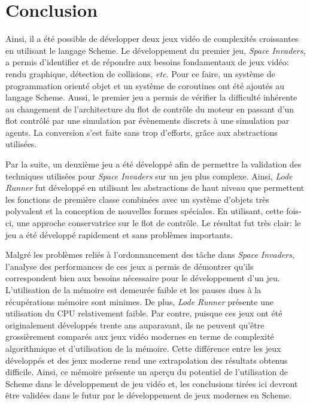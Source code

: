 \documentclass[12pt,twoside,letterpaper,francais]{book}
\begin{document}
\FloatBarrier
\section{Conclusion}
Ainsi, il a été possible de développer deux jeux vidéo de complexités
croissantes en utilisant le langage Scheme. Le dévelop\-pement du
premier jeu, \textit{Space Invaders}, a permis d'identifier et de
répondre aux besoins fondamentaux de jeux vidéo: rendu graphique,
détection de collisions, \textit{etc}. Pour ce faire, un système de
programmation orienté objet et un système de coroutines ont été
ajoutés au langage Scheme. Aussi, le premier jeu a permis de vérifier
la difficulté inhérente au changement de l'architecture du flot de
contrôle du moteur en passant d'un flot contrôlé par une simulation
par évènements discrets à une simulation par agents. La conversion
s'est faite sans trop d'efforts, grâce aux abstractions utilisées.

Par la suite, un deuxième jeu a été développé afin de permettre la
validation des techniques utilisées pour \textit{Space Invaders} sur
un jeu plus complexe. Ainsi, \textit{Lode Runner} fut développé en
utilisant les abstractions de haut niveau que permettent les fonctions
de première classe combinées avec un système d'objets très polyvalent
et la conception de nouvelles formes spéciales. En utilisant, cette
fois-ci, une approche conservatrice sur le flot de contrôle. Le
résultat fut très clair: le jeu a été développé rapidement et sans
problèmes importants.

Malgré les problèmes reliés à l'ordonnancement des tâche dans
\textit{Space Invaders}, l'analyse des performances de ces jeux a
permis de démontrer qu'ils correspondent bien aux besoins nécessaire
pour le développement d'un jeu. L'utilisation de la mémoire est
demeurée faible et les pauses dues à la récupérations mémoire sont
minimes. De plus, \textit{Lode Runner} présente une utilisation du CPU
relativement faible. Par contre, puisque ces jeux ont été
originalement développés trente ans auparavant, ils ne peuvent qu'être
grossièrement comparés aux jeux vidéo modernes en terme de complexité
algorithmique et d'utilisation de la mémoire. Cette différence entre
les jeux développés et des jeux moderne rend une extrapolation des
résultats obtenus difficile. Ainsi, ce mémoire présente un aperçu du
potentiel de l'utilisation de Scheme dans le développement de jeu
vidéo et, les conclusions tirées ici devront être validées dans le
futur par le développement de jeux modernes en Scheme.
\end{document}
